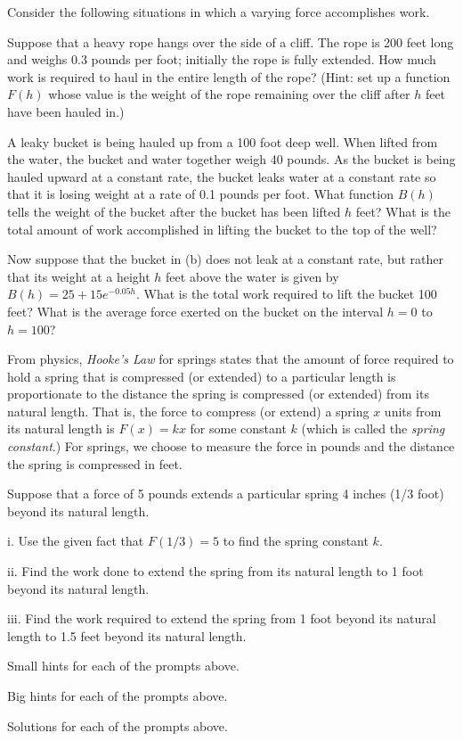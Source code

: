 \begin{activity} \label{A:6.5.1}  Consider the following situations in which a varying force accomplishes work.
\ba
	\item Suppose that a heavy rope hangs over the side of a cliff.  The rope is 200 feet long and weighs 0.3 pounds per foot; initially the rope is fully extended.  How much work is required to haul in the entire length of the rope?  (Hint: set up a function $F(h)$ whose value is the weight of the rope remaining over the cliff after $h$ feet have been hauled in.)
	\item A leaky bucket is being hauled up from a 100 foot deep well.  When lifted from the water, the bucket and water together weigh 40 pounds.  As the bucket is being hauled upward at a constant rate, the bucket leaks water at a constant rate so that it is losing weight at a rate of 0.1 pounds per foot.  What function $B(h)$ tells the weight of the bucket after the bucket has been lifted $h$ feet?  What is the total amount of work accomplished in lifting the bucket to the top of the well?
	\item Now suppose that the bucket in (b) does not leak at a constant rate, but rather that its weight at a height $h$ feet above the water is given by $B(h) = 25 + 15e^{-0.05h}$.  What is the total work required to lift the bucket 100 feet?  What is the average force exerted on the bucket on the interval $h = 0$ to $h = 100$?
	\item From physics, \emph{Hooke's Law}  for springs states that the amount of force required to hold a spring that is compressed (or extended) to a particular length is proportionate to the distance the spring is compressed (or extended) from its natural length.  That is, the force to compress (or extend) a spring $x$ units from its natural length is $F(x) = kx$ for some constant $k$ (which is called the \emph{spring constant}.) For springs, we choose to measure the force in pounds and the distance the spring is compressed in feet.
	
	Suppose that a force of 5 pounds extends a particular spring 4 inches (1/3 foot) beyond its natural length.
	\be
		\item[i.]  Use the given fact that $F(1/3) = 5$ to find the spring constant $k$.
		\item[ii.]  Find the work done to extend the spring from its natural length to 1 foot beyond its natural length.
		\item[iii.]  Find the work required to extend the spring from 1 foot beyond its natural length to 1.5 feet beyond its natural length.
	\ee

\ea

\end{activity}
\begin{smallhint}
\ba
	\item Small hints for each of the prompts above.
\ea
\end{smallhint}
\begin{bighint}
\ba
	\item Big hints for each of the prompts above.
\ea
\end{bighint}
\begin{activitySolution}
\ba
	\item Solutions for each of the prompts above.
\ea
\end{activitySolution}
\aftera